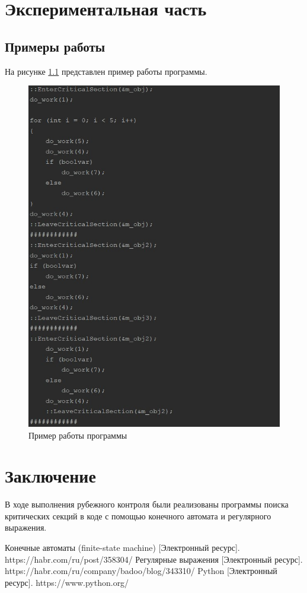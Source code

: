 \documentclass[12pt, a4paper]{report}
\begin{document}
	\newpage


	\chapter{Экспериментальная часть}
	\section{Примеры работы}
	\hspace{0.5cm}На рисунке \ref{fig:example} представлен пример работы программы.
	\begin{figure}[ht!]
		\centering
		\includegraphics[width=0.7\linewidth]{example.jpg}
		\caption{Пример работы программы}
		\label{fig:example}
	\end{figure}

	\chapter*{Заключение}
	\hspace{0.5cm}В ходе выполнения рубежного контроля были реализованы программы поиска критических секций в коде с помощью конечного автомата и регулярного выражения.
	
	\newpage
	
	\begin{thebibliography}{}
	 Конечные автоматы (finite-state machine) [Электронный ресурс]. https://habr.com/ru/post/358304/
	 Регулярные выражения [Электронный ресурс].  https://habr.com/ru/company/badoo/blog/343310/
	 Python [Электронный ресурс]. https://www.python.org/
	\end{thebibliography}
\end{document}
